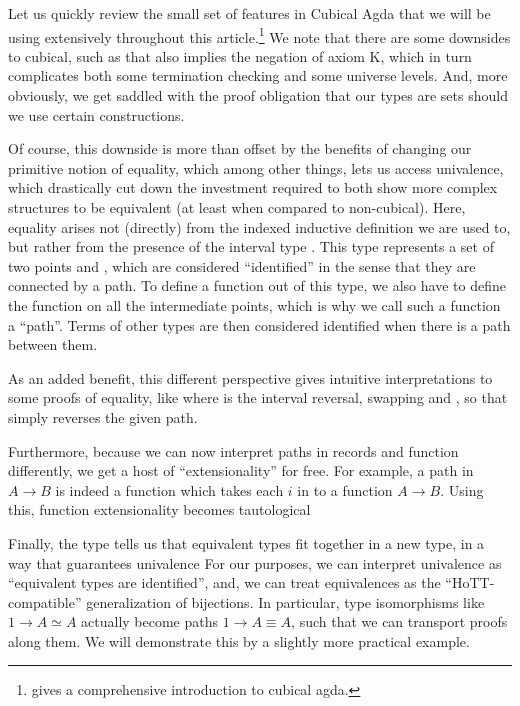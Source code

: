 \documentclass[Main.tex]{subfiles}
\begin{document}
Let us quickly review the small set of features in Cubical Agda that we will be using extensively throughout this article.\footnote{\cite{cuagda} gives a comprehensive introduction to cubical agda.} We note that there are some downsides to cubical, such as that
also implies the negation of axiom K, which in turn complicates both some termination checking and some universe levels. And, more obviously, we get saddled with the proof obligation that our types are sets should we use certain constructions.

Of course, this downside is more than offset by the benefits of changing our primitive notion of equality, which among other things, lets us access univalence, which drastically cut down the investment required to both show more complex structures to be equivalent (at least when compared to non-cubical). Here, equality arises not (directly) from the indexed inductive definition we are used to, but rather from the presence of the interval type . This type represents a set of two points  and , which are considered ``identified'' in the sense that they are connected by a path. To define a function out of this type, we also have to define the function on all the intermediate points, which is why we call such a function a ``path''. Terms of other types are then considered identified when there is a path between them.

As an added benefit, this different perspective gives intuitive interpretations to some proofs of equality, like
where  is the interval reversal, swapping  and , so that  simply reverses the given path.

Furthermore, because we can now interpret paths in records and function differently, we get a host of ``extensionality'' for free. For example, a path in $A \to B$ is indeed a function which takes each $i$ in  to a function $A \to B$. Using this, function extensionality becomes tautological 

Finally, the  type tells us that equivalent types fit together in a new type, in a way that guarantees univalence
For our purposes, we can interpret univalence as ``equivalent types are identified'', and, we can treat equivalences as the ``HoTT-compatible'' generalization of bijections. In particular, type isomorphisms like $1 \to A \simeq A$ actually become paths $1 \to A \equiv A$, such that we can transport proofs along them. We will demonstrate this by a slightly more practical example.
\end{document}
